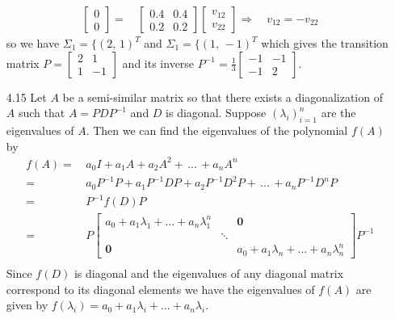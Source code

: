 \documentclass[letterpaper,12pt]{article}
\theoremstyle{definition}
\begin{document}
\begin{enumerate}
\begin{align*}
\begin{bmatrix}
0 \\ 0
\end{bmatrix} =&\, \begin{bmatrix}
0.4 & 0.4 \\ 0.2& 0.2
\end{bmatrix} \begin{bmatrix}
v_{12} \\ v_{22} 
\end{bmatrix} 
\Rightarrow \quad v_{12} = -v_{22}
\end{align*} 
so we have $\Sigma_1=\{(2,\, 1)^T$ and $\Sigma_1=\{(1,\, -1)^T$ which gives the transition matrix $P=\begin{bmatrix}
2 & 1\\ 1 & -1
\end{bmatrix} $ and its inverse $P^{-1}=\frac{1}{3}\begin{bmatrix}
-1 & -1\\ -1 & 2
\end{bmatrix} $.
\item[4.15]
Let $A$ be a semi-similar matrix so that there exists a diagonalization of $A$ such that $A=PDP^{-1}$ and $D$ is diagonal. Suppose $(\lambda_{i})_{i=1}^{n}$ are the eigenvalues of $A$. Then we can find the eigenvalues of the polynomial $f(A)$ by
\begin{align*}
f(A) =&\,  a_0 I+ a_1A + a_2 A^2 +\,  ...\, + a_nA^n\\
 =&\,  a_0 P^{-1}P+ a_1P^{-1}DP + a_2 P^{-1}D^2P  +\,  ...\, + a_nP^{-1}D^nP \\
 =&\,  P^{-1}f(D)P \\
=&\, P  \begin{bmatrix}
    a_{0} + a_{1}\lambda_{1} + ... + a_{n}\lambda_{1}^{n} & &\mathbf{0} \\
    & \ddots &  \\
    \mathbf{0}& &  a_{0} + a_{1}\lambda_{n} + ... + a_{n}\lambda_{n}^{n}
  \end{bmatrix} P^{-1}\\
\end{align*}
Since $f(D)$ is diagonal and the eigenvalues of any diagonal matrix correspond to its diagonal elements we have the eigenvalues of $f(A)$ are given by $f(\lambda_{i}) = a_{0} + a_{1}\lambda_{i} + ... + a_{n}\lambda_{i}$.


\end{enumerate}
\end{document}
